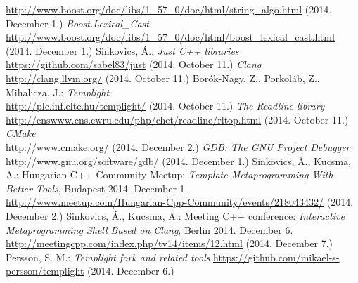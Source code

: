 \begin{thebibliography}{99}
    \url{http://www.boost.org/doc/libs/1_57_0/doc/html/string_algo.html}
    (2014. December 1.)
    \textit{Boost.Lexical\_Cast} \\
    \url{http://www.boost.org/doc/libs/1_57_0/doc/html/boost_lexical_cast.html}
    (2014. December 1.)
    Sinkovics, Á.:
    \textit{Just C++ libraries} \\
    \url{https://github.com/sabel83/just} (2014. October 11.)
    \textit{Clang} \\
    \url{http://clang.llvm.org/} (2014. October 11.)
    Borók-Nagy, Z., Porkoláb, Z., Mihalicza, J.:
    \textit{Templight} \\
    \url{http://plc.inf.elte.hu/templight/} (2014. October 11.)
    \textit{The Readline library} \\
    \url{http://cnswww.cns.cwru.edu/php/chet/readline/rltop.html}
    (2014. October 11.)
    \textit{CMake} \\
    \url{http://www.cmake.org/}
    (2014. December 2.)
    \textit{GDB: The GNU Project Debugger} \\
    \url{http://www.gnu.org/software/gdb/}
    (2014. December 1.)
    Sinkovics, Á., Kucsma, A.:
    Hungarian C++ Community Meetup:
    \textit{Template Metaprogramming With Better Tools}, Budapest 2014.
    December 1. \\
    \url{http://www.meetup.com/Hungarian-Cpp-Community/events/218043432/}
    (2014. December 2.)
    Sinkovics, Á., Kucsma, A.:
    Meeting C++ conference:
    \textit{Interactive Metaprogramming Shell Based on Clang}, Berlin 2014.
    December 6.
    \url{http://meetingcpp.com/index.php/tv14/items/12.html}
    (2014. December 7.)
    Persson, S. M.:
    \textit{Templight fork and related tools}
    \url{https://github.com/mikael-s-persson/templight}
    (2014. December 6.)
\end{thebibliography}
